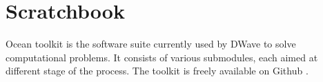 \chapter{Scratchbook}
Ocean toolkit is the software suite currently used by DWave to solve computational problems. It consists of various submodules, each aimed at different stage of the process. The toolkit is freely available on Github \cite{DWGitHub}.